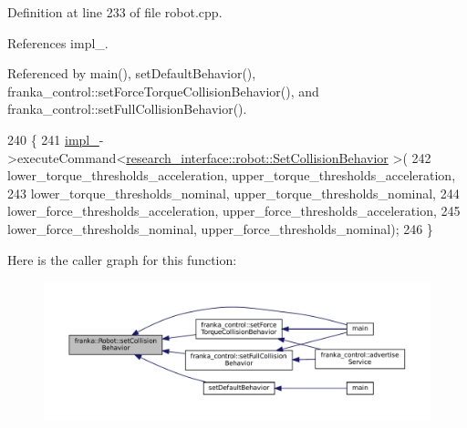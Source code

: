Definition at line 233 of file robot.\+cpp.



References impl\+\_\+.



Referenced by main(), set\+Default\+Behavior(), franka\+\_\+control\+::set\+Force\+Torque\+Collision\+Behavior(), and franka\+\_\+control\+::set\+Full\+Collision\+Behavior().


\begin{DoxyCode}
240                                                                                             \{
241   \hyperlink{classfranka_1_1Robot_aca155054184e5b6478942fd6a1b82ba4}{impl\_}->executeCommand<\hyperlink{structresearch__interface_1_1robot_1_1SetCollisionBehavior}{research\_interface::robot::SetCollisionBehavior}
      >(
242       lower\_torque\_thresholds\_acceleration, upper\_torque\_thresholds\_acceleration,
243       lower\_torque\_thresholds\_nominal, upper\_torque\_thresholds\_nominal,
244       lower\_force\_thresholds\_acceleration, upper\_force\_thresholds\_acceleration,
245       lower\_force\_thresholds\_nominal, upper\_force\_thresholds\_nominal);
246 \}
\end{DoxyCode}
Here is the caller graph for this function\+:
\nopagebreak
\begin{figure}[H]
\begin{center}
\leavevmode
\includegraphics[width=350pt]{classfranka_1_1Robot_a168e1214ac36d74ac64f894332b84534_icgraph}
\end{center}
\end{figure}
\mbox{\label{classfranka_1_1Robot_aa188f58c9025594be4d1700da744a962}} 
